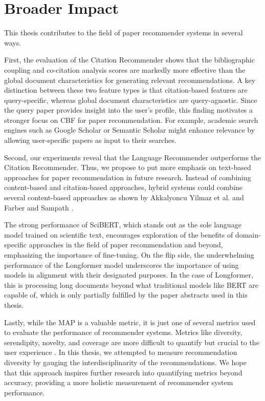 \section{Broader Impact} \label{sec:broader-impact}

This thesis contributes to the field of paper recommender systems in several ways.

First, the evaluation of the Citation Recommender shows that the bibliographic coupling and co-citation analysis scores are markedly more effective than the global document characteristics for generating relevant recommendations.
A key distinction between these two feature types is that citation-based features are query-specific, whereas global document characteristics are query-agnostic.
Since the query paper provides insight into the user's profile, this finding motivates a stronger focus on \ac{CBF} for paper recommendation.
For example, academic search engines such as Google Scholar or Semantic Scholar might enhance relevance by allowing user-specific papers as input to their searches.

Second, our experiments reveal that the Language Recommender outperforms the Citation Recommender.
Thus, we propose to put more emphasis on text-based approaches for paper recommendation in future research.
Instead of combining content-based and citation-based approaches, hybrid systems could combine several content-based approaches as shown by Akkalyoncu Yilmaz et al. \cite{AkkalyoncuYilmazApplyingBERT2019} and Farber and Sampath \cite{FarberHybridCiteHybrid2020}.

The strong performance of SciBERT, which stands out as the sole language model trained on scientific text, encourages exploration of the benefits of domain-specific approaches in the field of paper recommendation and beyond, emphasizing the importance of fine-tuning.
On the flip side, the underwhelming performance of the Longformer model underscores the importance of using models in alignment with their designated purposes.
In the case of Longformer, this is processing long documents beyond what traditional models like BERT are capable of, which is only partially fulfilled by the paper abstracts used in this thesis.

Lastly, while the \ac{MAP} is a valuable metric, it is just one of several metrics used to evaluate the performance of recommender systems.
Metrics like diversity, serendipity, novelty, and coverage are more difficult to quantify but crucial to the user experience \cite{KaminskasDiversitySerendipity2016,SilveiraHowGood2019,BaiScientificPaper2020}.
In this thesis, we attempted to measure recommendation diversity by gauging the interdisciplinarity of the recommendations.
We hope that this approach inspires further research into quantifying metrics beyond accuracy, providing a more holistic measurement of recommender system performance.
